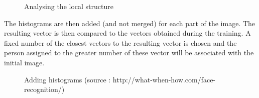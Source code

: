 \begin{figure}[ht]
\centering
\caption{Analysing the local structure}
\label{Local Structure}
\end{figure}

The histograms are then added (and not merged) for each part of the image. The resulting vector is then compared to the vectors obtained during the training. A fixed number of the closest vectors to the resulting vector is chosen and the person assigned to the greater number of these vector will be associated with the initial image.

\begin{figure}[ht]
\centering
\caption{Adding histograms (source : http://what-when-how.com/face-recognition/)}
\label{Adding histograms}
\end{figure}

